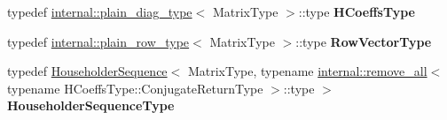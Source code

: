 \begin{DoxyCompactItemize}
\item 
\mbox{\label{group___q_r___module_a9262c3ac9ce88401189952feffeedade}} 
typedef \hyperlink{struct_eigen_1_1internal_1_1plain__diag__type}{internal\+::plain\+\_\+diag\+\_\+type}$<$ Matrix\+Type $>$\+::type {\bfseries H\+Coeffs\+Type}
\item 
\mbox{\label{group___q_r___module_aef2e07eccf00487740690992eba6530a}} 
typedef \hyperlink{struct_eigen_1_1internal_1_1plain__row__type}{internal\+::plain\+\_\+row\+\_\+type}$<$ Matrix\+Type $>$\+::type {\bfseries Row\+Vector\+Type}
\item 
\mbox{\label{group___q_r___module_a3c0de7c71cdf19f7805bf5c43df0ec4a}} 
typedef \hyperlink{group___householder___module_class_eigen_1_1_householder_sequence}{Householder\+Sequence}$<$ Matrix\+Type, typename \hyperlink{struct_eigen_1_1internal_1_1remove__all}{internal\+::remove\+\_\+all}$<$ typename H\+Coeffs\+Type\+::\+Conjugate\+Return\+Type $>$\+::type $>$ {\bfseries Householder\+Sequence\+Type}
\end{DoxyCompactItemize}
